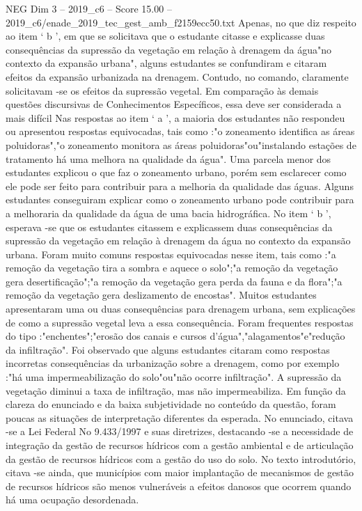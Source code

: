 \begin{textsample}{NEG Dim 3 – 2019\_c6 – Score 15.00 – 2019\_c6/enade\_2019\_tec\_gest\_amb\_f2159ecc50.txt}
Apenas, no que diz respeito ao item ‘ b ’, em que se solicitava que o estudante citasse e explicasse duas consequências da supressão da vegetação em relação à drenagem da água"no contexto da expansão urbana", alguns estudantes se confundiram e citaram efeitos da expansão urbanizada na drenagem.
Contudo, no comando, claramente solicitavam -se os efeitos da supressão vegetal.
Em comparação às demais questões discursivas de Conhecimentos Específicos, essa deve ser considerada a mais difícil Nas respostas ao item ‘ a ’, a maioria dos estudantes não respondeu ou apresentou respostas equivocadas, tais como :"o zoneamento identifica as áreas poluidoras","o zoneamento monitora as áreas poluidoras"ou"instalando estações de tratamento há uma melhora na qualidade da água".
Uma parcela menor dos estudantes explicou o que faz o zoneamento urbano, porém sem esclarecer como ele pode ser feito para contribuir para a melhoria da qualidade das águas.
Alguns estudantes conseguiram explicar como o zoneamento urbano pode contribuir para a melhoraria da qualidade da água de uma bacia hidrográfica.
No item ‘ b ’, esperava -se que os estudantes citassem e explicassem duas consequências da supressão da vegetação em relação à drenagem da água no contexto da expansão urbana.
Foram muito comuns respostas equivocadas nesse item, tais como :"a remoção da vegetação tira a sombra e aquece o solo";"a remoção da vegetação gera desertificação";"a remoção da vegetação gera perda da fauna e da flora";"a remoção da vegetação gera deslizamento de encostas".
Muitos estudantes apresentaram uma ou duas consequências para drenagem urbana, sem explicações de como a supressão vegetal leva a essa consequência.
Foram frequentes respostas do tipo :"enchentes";"erosão dos canais e cursos d'água","alagamentos"e"redução da infiltração".
Foi observado que alguns estudantes citaram como respostas incorretas consequências da urbanização sobre a drenagem, como por exemplo :"há uma impermeabilização do solo"ou"não ocorre infiltração".
A supressão da vegetação diminui a taxa de infiltração, mas não impermeabiliza.
Em função da clareza do enunciado e da baixa subjetividade no conteúdo da questão, foram poucas as situações de interpretação diferentes da esperada.
No enunciado, citava -se a Lei Federal No 9.433/1997 e suas diretrizes, destacando -se a necessidade de integração da gestão de recursos hídricos com a gestão ambiental e de articulação da gestão de recursos hídricos com a gestão do uso do solo.
No texto introdutório, citava -se ainda, que municípios com maior implantação de mecanismos de gestão de recursos hídricos são menos vulneráveis a efeitos danosos que ocorrem quando há uma ocupação desordenada.

\end{textsample}
